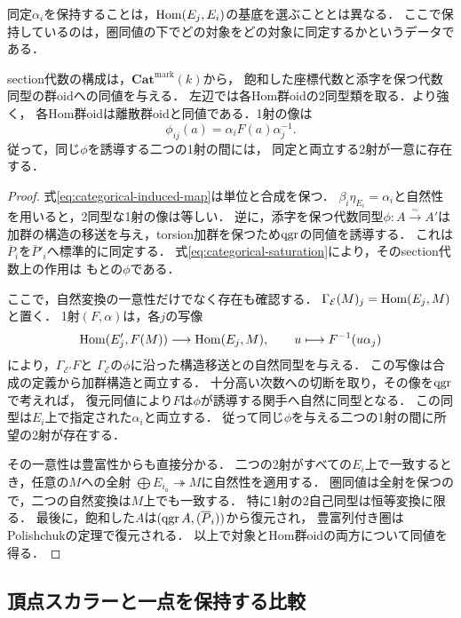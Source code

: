 同定$\alpha_i$を保持することは，$\operatorname{Hom}(E_j,E_i)$の基底を選ぶこととは異なる．
ここで保持しているのは，圏同値の下でどの対象をどの対象に同定するかというデータである．

\begin{theorem}[全同定付き圏と厳密な代数同型]
\label{thm:categorical-marked-equivalence}
section代数の構成は，$\mathbf{Cat}^{\mathrm{mark}}(k)$から，
飽和した座標代数と添字を保つ代数同型の群oidへの同値を与える．
左辺では各Hom群oidの2同型類を取る．より強く，
各Hom群oidは離散群oidと同値である．1射の像は
\begin{equation}\label{eq:categorical-induced-map}
 \phi_{ij}(a)=\alpha_iF(a)\alpha_j^{-1}.
\end{equation}
従って，同じ$\phi$を誘導する二つの1射の間には，
同定と両立する2射が一意に存在する．
\end{theorem}
\begin{proof}
式\eqref{eq:categorical-induced-map}は単位と合成を保つ．
$\beta_i\eta_{E_i}=\alpha_i$と自然性を用いると，2同型な1射の像は等しい．
逆に，添字を保つ代数同型$\phi:A\xrightarrow{\sim}A'$は
加群の構造の移送を与え，torsion加群を保つため$\operatorname{qgr}$の同値を誘導する．
これは$\overline P_i$を$\overline P'_i$へ標準的に同定する．
式\eqref{eq:categorical-saturation}により，そのsection代数上の作用は
もとの$\phi$である．

ここで，自然変換の一意性だけでなく存在も確認する．
$\Gamma_{\mathcal E}(M)_j=\operatorname{Hom}(E_j,M)$と置く．
1射$(F,\alpha)$は，各$j$の写像
\[
 \operatorname{Hom}(E'_j,F(M))\longrightarrow\operatorname{Hom}(E_j,M),
 \qquad u\longmapsto F^{-1}(u\alpha_j)
\]
により，$\Gamma_{\mathcal E'}F$と
$\Gamma_{\mathcal E}$の$\phi$に沿った構造移送との自然同型を与える．
この写像は合成の定義から加群構造と両立する．
十分高い次数への切断を取り，その像を$\operatorname{qgr}$で考えれば，
復元同値により$F$は$\phi$が誘導する関手へ自然に同型となる．
この同型は$E_i$上で指定された$\alpha_i$と両立する．
従って同じ$\phi$を与える二つの1射の間に所望の2射が存在する．

その一意性は豊富性からも直接分かる．
二つの2射がすべての$E_i$上で一致するとき，任意の$M$への全射
$\bigoplus E_{i_a}\twoheadrightarrow M$に自然性を適用する．
圏同値は全射を保つので，二つの自然変換は$M$上でも一致する．
特に1射の2自己同型は恒等変換に限る．
最後に，飽和した$A$は$(\operatorname{qgr} A,(\overline P_i))$から復元され，
豊富列付き圏はPolishchukの定理で復元される．
以上で対象とHom群oidの両方について同値を得る．
\end{proof}

\subsection{頂点スカラーと一点を保持する比較}

